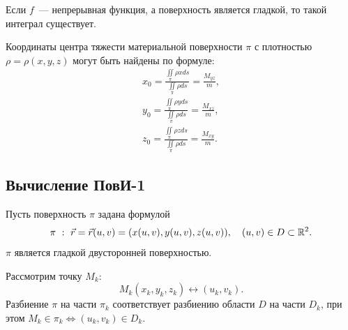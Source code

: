 \documentclass[../../main.tex]{subfiles}
\begin{document}
	Если $f$~--- непрерывная функция, а поверхность является гладкой, то такой 
	интеграл существует.

	Координаты центра тяжести материальной поверхности $\pi$ с плотностью $\rho =
	 \rho(x,y,z)$ могут быть найдены по формуле: 
	\begin{gather*}x_0 = \frac{\iint \limits_\pi \rho  x ds}{\iint \limits_\pi 
	\rho ds} =
	 \frac{M_{yz}}{m}, \\
	y_0 = \frac{\iint \limits_\pi \rho  y ds}{\iint \limits_\pi \rho ds} =
	 \frac{M_{xz}}{m}, \\
	z_0 = \frac{\iint \limits_\pi \rho  z ds}{\iint \limits_\pi \rho ds} =
	 \frac{M_{xy}}{m}.
	 \end{gather*}
	
	\subsection{Вычисление ПовИ-1}
	Пусть поверхность $\pi$ задана формулой \[\pi \ : \ \vec{r} =
	 \vec{r}(u, v) = (x(u,v), y(u,v), z(u, v)),\quad (u, v) \in D
	  \subset \mathbb{R}^2.\] $\pi$ является гладкой двусторонней
	   поверхностью.
	   
	Рассмотрим точку $M_k$:
	\[M_k(x_k, y_k, z_k) \leftrightarrow (u_k, v_k).\]
	Разбиение $\pi$ на части $\pi_k$ соответствует разбиению области $D$ на части $D_k$, при 
	этом
	${M_k \in \pi_k} \iff (u_k, v_k) \in D_k$.
	 
\end{document}
